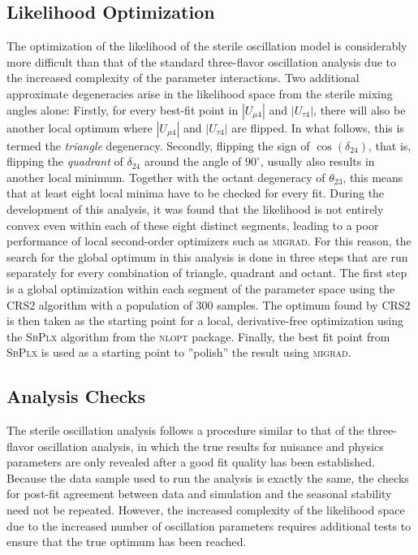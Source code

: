 \subsection{Likelihood Optimization}
The optimization of the likelihood of the sterile oscillation model is considerably more difficult than that of the standard three-flavor oscillation analysis due to the increased complexity of the parameter interactions.
Two additional approximate degeneracies arise in the likelihood space from the sterile mixing angles alone: Firstly, for every best-fit point in $|U_{\mu 4}|$ and $|U_{\tau 4}|$, there will also be another local optimum where $|U_{\mu 4}|$ and $|U_{\tau 4}|$ are flipped.
In what follows, this is termed the \emph{triangle} degeneracy.
Secondly, flipping the sign of $\cos(\delta_{24})$, that is, flipping the \emph{quadrant} of $\delta_{24}$ around the angle of $90^\circ$, usually also results in another local minimum.
Together with the octant degeneracy of $\theta_{23}$, this means that at least eight local minima have to be checked for every fit.
During the development of this analysis, it was found that the likelihood is not entirely convex even within each of these eight distinct segments, leading to a poor performance of local second-order optimizers such as \textsc{migrad}\cite{minuit-algo}.
For this reason, the search for the global optimum in this analysis is done in three steps that are run separately for every combination of triangle, quadrant and octant.
The first step is a global optimization within each segment of the parameter space using the CRS2\cite{crs2} algorithm with a population of 300 samples.
The optimum found by CRS2 is then taken as the starting point for a local, derivative-free optimization using the \textsc{SbPlx}\cite{subplex} algorithm from the \textsc{nlopt}\cite{nlopt} package.
Finally, the best fit point from  \textsc{SbPlx} is used as a starting point to ''polish'' the result using \textsc{migrad}\cite{minuit-algo}.

\subsection{Analysis Checks}

The sterile oscillation analysis follows a procedure similar to that of the three-flavor oscillation analysis, in which the true results for nuisance and physics parameters are only revealed after a good fit quality has been established.
Because the data sample used to run the analysis is exactly the same, the checks for post-fit agreement between data and simulation and the seasonal stability need not be repeated.
However, the increased complexity of the likelihood space due to the increased number of oscillation parameters requires additional tests to ensure that the true optimum has been reached.

